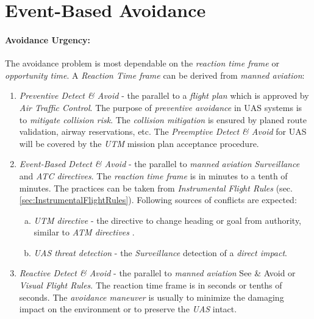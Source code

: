 \section{Event-Based Avoidance}\label{sec:EventBasedAvoidance}
\paragraph{Avoidance Urgency:} The avoidance problem is most dependable on the \emph{reaction time frame} or \emph{opportunity time}. A \emph{Reaction Time frame} can be derived from \emph{manned aviation}:

\begin{enumerate}
    \item \emph{Preventive Detect \& Avoid} - the parallel to a \emph{flight plan} which is approved by \emph{Air Traffic Control}. The purpose of \emph{preventive avoidance} in UAS systems is to \emph{mitigate collision risk}. The \emph{collision mitigation} is ensured by planed route validation, airway reservations, etc. The \emph{Preemptive Detect \& Avoid} for UAS will be covered by the \emph{UTM} mission plan acceptance procedure.  
    
    \item \emph{Event-Based Detect \& Avoid} - the parallel to \emph{manned aviation} \emph{Surveillance} and \emph{ATC directives}. The \emph{reaction time frame} is in minutes to a tenth of minutes. The practices can be taken from \emph{Instrumental Flight Rules} (sec. \ref{sec:InstrumentalFlightRules}). Following sources of conflicts are expected:
    \begin{enumerate}[a.]
        \item \emph{UTM directive} - the directive to change heading or goal from authority, similar to \emph{ATM directives} \cite{icao4444}.
        
        \item \emph{UAS threat detection} - the \emph{Surveillance} detection of a \emph{direct impact}.
    \end{enumerate}
    
    \item \emph{Reactive Detect \& Avoid} - the parallel to \emph{manned aviation} See \& Avoid or \emph{Visual Flight Rules}. The reaction time frame is in seconds or tenths of seconds. The \emph{avoidance maneuver} is usually to minimize the damaging impact on the environment or to preserve the \emph{UAS} intact.
\end{enumerate}

